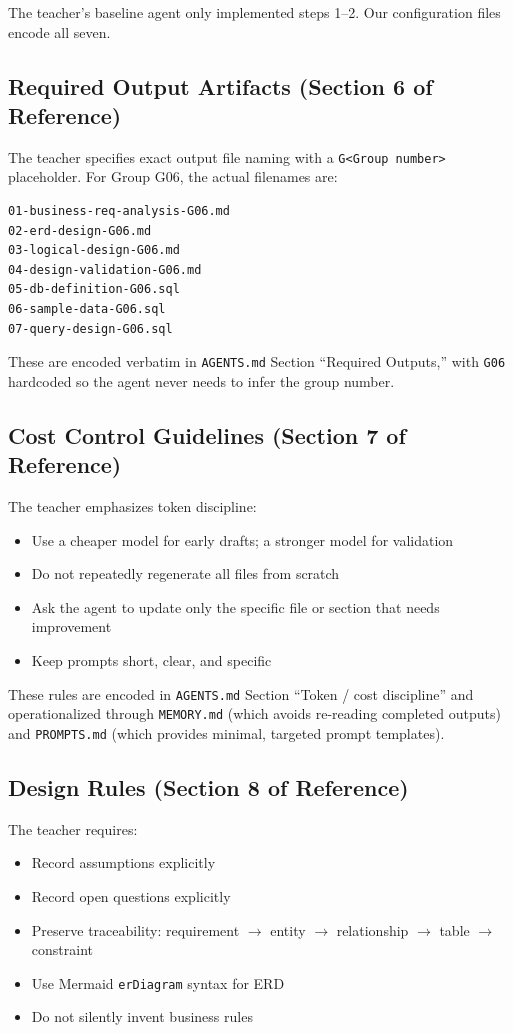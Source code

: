 \documentclass[12pt,a4paper]{article}
\begin{document}
The teacher's baseline agent only implemented steps 1--2. Our configuration files encode all seven.

\subsection{Required Output Artifacts (Section 6 of Reference)}

The teacher specifies exact output file naming with a \texttt{G<Group number>} placeholder. For Group G06, the actual filenames are:
\begin{lstlisting}
01-business-req-analysis-G06.md
02-erd-design-G06.md
03-logical-design-G06.md
04-design-validation-G06.md
05-db-definition-G06.sql
06-sample-data-G06.sql
07-query-design-G06.sql
\end{lstlisting}

These are encoded verbatim in \texttt{AGENTS.md} Section ``Required Outputs,'' with \texttt{G06} hardcoded so the agent never needs to infer the group number.

\subsection{Cost Control Guidelines (Section 7 of Reference)}

The teacher emphasizes token discipline:
\begin{itemize}
    \item Use a cheaper model for early drafts; a stronger model for validation
    \item Do not repeatedly regenerate all files from scratch
    \item Ask the agent to update only the specific file or section that needs improvement
    \item Keep prompts short, clear, and specific
\end{itemize}

These rules are encoded in \texttt{AGENTS.md} Section ``Token / cost discipline'' and operationalized through \texttt{MEMORY.md} (which avoids re-reading completed outputs) and \texttt{PROMPTS.md} (which provides minimal, targeted prompt templates).

\subsection{Design Rules (Section 8 of Reference)}

The teacher requires:
\begin{itemize}
    \item Record assumptions explicitly
    \item Record open questions explicitly
    \item Preserve traceability: requirement $\rightarrow$ entity $\rightarrow$ relationship $\rightarrow$ table $\rightarrow$ constraint
    \item Use Mermaid \texttt{erDiagram} syntax for ERD
    \item Do not silently invent business rules
\end{itemize}
\end{document}
